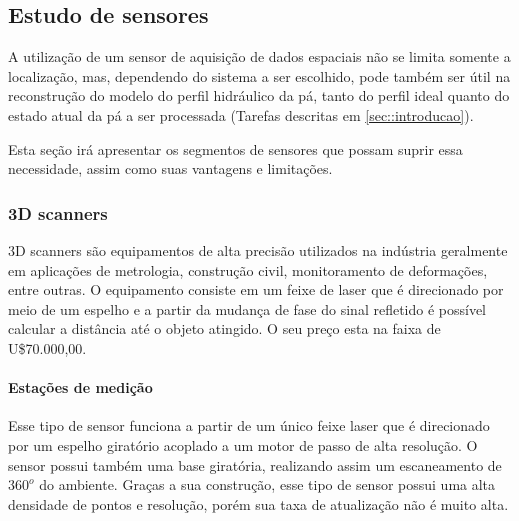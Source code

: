 \subsection{Estudo de sensores}

A utilização de um sensor de aquisição de dados espaciais não se limita somente
a loca\-lização, mas, dependendo do sistema a ser escolhido, pode também ser
útil na reconstru\-ção do modelo do perfil hidráulico da pá, tanto do perfil
ideal quanto do estado atual da pá a ser processada (Tarefas descritas em
\ref{sec::introducao}).

Esta seção irá apresentar os segmentos de sensores que possam suprir essa
necessidade, assim como suas vantagens e limitações. 


\subsubsection{3D scanners}

3D scanners são equipamentos de alta precisão utilizados na indústria
geralmente em aplicações de metrologia, construção civil, monitoramento de
deformações, entre outras. O equipamento consiste em um feixe de laser que é
direcionado por meio de um espelho e a partir da mudança de fase do sinal
refletido é possível calcular a distância até o objeto atingido. O seu preço
esta na faixa de U\$70.000,00.

\paragraph{Estações de medição}

Esse tipo de sensor funciona a partir de um único feixe laser que é direcionado
por um espelho giratório acoplado a um motor de passo de alta resolução. O
sensor possui também uma base giratória, realizando assim um escaneamento de
$360^o$ do ambiente. Graças a sua construção, esse tipo de sensor possui uma
alta densidade de pontos e resolução, porém sua taxa de atualização não é muito
alta.

